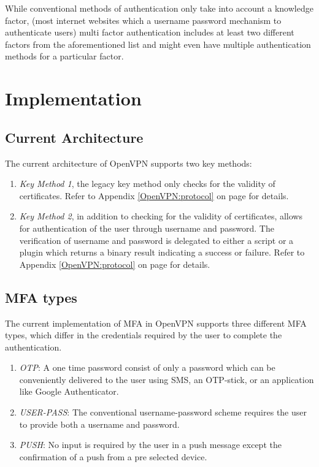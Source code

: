 \documentclass[11pt,oneside]{book}
\begin{document}
While conventional methods of authentication only take into account a knowledge factor,
(most internet websites which a username password mechanism to authenticate users)
multi factor authentication includes at least two different factors from the aforementioned
list and might even have multiple authentication methods for a particular factor.

\section{Implementation}
\subsection{Current Architecture}
The current architecture of OpenVPN supports two key methods:

\begin{enumerate}
    \item \emph{Key Method 1}, the legacy key method only checks for the validity of certificates.
        Refer to Appendix \ref{OpenVPN:protocol} on page \pageref{OpenVPN:protocol} for details.
    \item \emph{Key Method 2}, in addition to checking for the validity of certificates, allows for
        authentication of the user through username and password. The verification of username and
        password is delegated to either a script or a plugin which returns a binary result
        indicating a success or failure.
        Refer to Appendix \ref{OpenVPN:protocol} on page \pageref{OpenVPN:protocol} for details.
\end{enumerate}

\subsection{MFA types}
The current implementation of MFA in OpenVPN supports three different MFA types, which differ
in the credentials required by the user to complete the authentication.

\begin{enumerate}
    \item \emph{OTP}: A one time password consist of only a password which can be conveniently
        delivered to the user using SMS, an OTP-stick, or an application like Google Authenticator.
    \item \emph{USER-PASS}: The conventional username-password scheme requires the user to provide
        both a username and password.
    \item \emph{PUSH}: No input is required by the user in a push message except the confirmation
        of a push from a pre selected device.
\end{enumerate}
\end{document}
